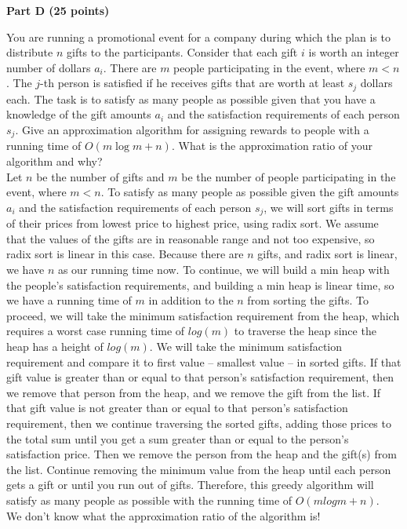 \documentclass{article}
\begin{document}
\begin{center}
{\bf Part D (25 points)}
\end{center}

 You are running a promotional event for a
company during which the plan is to distribute $n$ gifts to the
participants. Consider that each gift $i$ is worth an integer number
of dollars $a_i$. There are $m$ people participating in the event,
where $m < n$. The $j$-th person is satisfied if he receives gifts
that are worth at least $s_j$ dollars each. The task is to satisfy as
many people as possible given that you have a knowledge of the gift
amounts $a_i$ and the satisfaction requirements of each person
$s_j$. Give an approximation algorithm for assigning rewards to people
with a running time of $O(m\log m+n)$. What is the approximation ratio
of your algorithm and why?\\

\noindent Let $n$ be the number of gifts and $m$ be the number of people participating in the event, where $m<n$. To satisfy as many people as possible given the gift amounts $a_i$ and the satisfaction requirements of each person $s_j$, we will sort gifts in terms of their prices from lowest price to highest price, using radix sort. We assume that the values of the gifts are in reasonable range and not too expensive, so radix sort is linear in this case. Because there are $n$ gifts, and radix sort is linear, we have $n$ as our running time now. To continue, we will build a min heap with the people's satisfaction requirements, and building a min heap is linear time, so we have a running time of $m$ in addition to the $n$ from sorting the gifts. To proceed, we will take the minimum satisfaction requirement from the heap, which requires a worst case running time of $log(m)$ to traverse the heap since the heap has a height of $log(m)$. We will take the minimum satisfaction requirement and compare it to first value -- smallest value -- in sorted gifts. If that gift value is greater than or equal to that person's satisfaction requirement, then we remove that person from the heap, and we remove the gift from the list. If that gift value is not greater than or equal to that person's satisfaction requirement, then we continue traversing the sorted gifts, adding those prices to the total sum until you get a sum greater than or equal to the person's satisfaction price. Then we remove the person from the heap and the gift(s) from the list. Continue removing the minimum value from the heap until each person gets a gift or until you run out of gifts. Therefore, this greedy algorithm will satisfy as many people as possible with the running time of $O(mlogm + n)$.\\

\noindent We don't know what the approximation ratio of the algorithm is!
\end{document}
